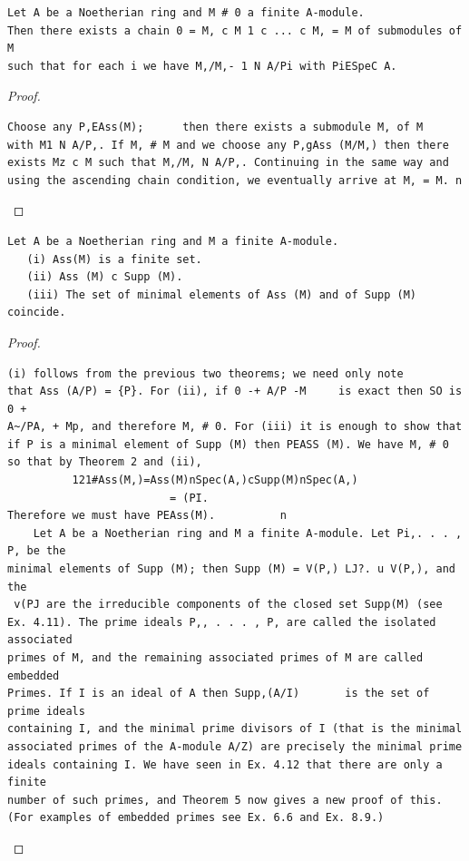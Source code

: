 \begin{theorem}\label{mcrt-auto-theorem-6-4}\uses{}
\begin{verbatim}
Let A be a Noetherian ring and M # 0 a finite A-module.
Then there exists a chain 0 = M, c M 1 c ... c M, = M of submodules of M
such that for each i we have M,/M,- 1 N A/Pi with PiESpeC A.
\end{verbatim}
\end{theorem}
\begin{proof}
\begin{verbatim}
Choose any P,EAss(M);      then there exists a submodule M, of M
with M1 N A/P,. If M, # M and we choose any P,gAss (M/M,) then there
exists Mz c M such that M,/M, N A/P,. Continuing in the same way and
using the ascending chain condition, we eventually arrive at M, = M. n
\end{verbatim}
\end{proof}


\begin{theorem}\label{mcrt-auto-theorem-6-5}\uses{}
\begin{verbatim}
Let A be a Noetherian ring and M a finite A-module.
   (i) Ass(M) is a finite set.
   (ii) Ass (M) c Supp (M).
   (iii) The set of minimal elements of Ass (M) and of Supp (M) coincide.
\end{verbatim}
\end{theorem}
\begin{proof}
\begin{verbatim}
(i) follows from the previous two theorems; we need only note
that Ass (A/P) = {P}. For (ii), if 0 -+ A/P -M     is exact then SO is 0 +
A~/PA, + Mp, and therefore M, # 0. For (iii) it is enough to show that
if P is a minimal element of Supp (M) then PEASS (M). We have M, # 0
so that by Theorem 2 and (ii),
          121#Ass(M,)=Ass(M)nSpec(A,)cSupp(M)nSpec(A,)
                         = (PI.
Therefore we must have PEAss(M).          n
    Let A be a Noetherian ring and M a finite A-module. Let Pi,. . . , P, be the
minimal elements of Supp (M); then Supp (M) = V(P,) LJ?. u V(P,), and the
 v(PJ are the irreducible components of the closed set Supp(M) (see
Ex. 4.11). The prime ideals P,, . . . , P, are called the isolated associated
primes of M, and the remaining associated primes of M are called embedded
Primes. If I is an ideal of A then Supp,(A/I)       is the set of prime ideals
containing I, and the minimal prime divisors of I (that is the minimal
associated primes of the A-module A/Z) are precisely the minimal prime
ideals containing I. We have seen in Ex. 4.12 that there are only a finite
number of such primes, and Theorem 5 now gives a new proof of this.
(For examples of embedded primes see Ex. 6.6 and Ex. 8.9.)
\end{verbatim}
\end{proof}



